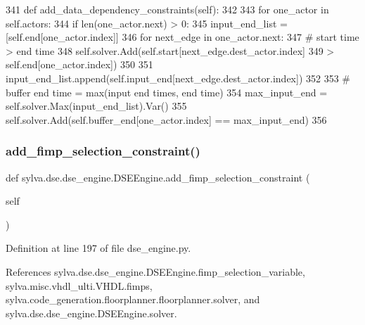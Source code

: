 \begin{DoxyCode}
341     \textcolor{keyword}{def }add\_data\_dependency\_constraints(self):
342 
343         \textcolor{keywordflow}{for} one\_actor \textcolor{keywordflow}{in} self.actors:
344             \textcolor{keywordflow}{if} len(one\_actor.next) > 0:
345                 input\_end\_list = [self.end[one\_actor.index]]
346                 \textcolor{keywordflow}{for} next\_edge \textcolor{keywordflow}{in} one\_actor.next:
347                     \textcolor{comment}{# start time > end time}
348                     self.solver.Add(self.start[next\_edge.dest\_actor.index]
349                                     > self.end[one\_actor.index])
350 
351                     input\_end\_list.append(self.input\_end[next\_edge.dest\_actor.index])
352 
353                 \textcolor{comment}{# buffer end time = max(input end times, end time)}
354                 max\_input\_end = self.solver.Max(input\_end\_list).Var()
355                 self.solver.Add(self.buffer\_end[one\_actor.index] == max\_input\_end)
356 
\end{DoxyCode}
\mbox{\label{classsylva_1_1dse_1_1dse__engine_1_1_d_s_e_engine_a0da712297ca8f39a612f8c7daa8a98f7}} 
\subsubsection{\texorpdfstring{add\+\_\+fimp\+\_\+selection\+\_\+constraint()}{add\_fimp\_selection\_constraint()}}
{\footnotesize\ttfamily def sylva.\+dse.\+dse\+\_\+engine.\+D\+S\+E\+Engine.\+add\+\_\+fimp\+\_\+selection\+\_\+constraint (\begin{DoxyParamCaption}\item[{}]{self }\end{DoxyParamCaption})}



Definition at line 197 of file dse\+\_\+engine.\+py.



References sylva.\+dse.\+dse\+\_\+engine.\+D\+S\+E\+Engine.\+fimp\+\_\+selection\+\_\+variable, sylva.\+misc.\+vhdl\+\_\+ulti.\+V\+H\+D\+L.\+fimps, sylva.\+code\+\_\+generation.\+floorplanner.\+floorplanner.\+solver, and sylva.\+dse.\+dse\+\_\+engine.\+D\+S\+E\+Engine.\+solver.


